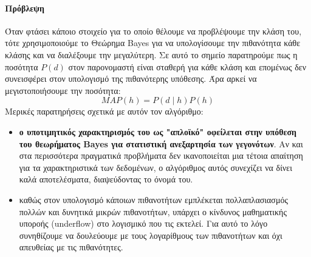 \paragraph{Πρόβλεψη} Όταν φτάσει κάποιο στοιχείο για το οποίο θέλουμε να προβλέψουμε την κλάση του, τότε χρησιμοποιούμε το Θεώρημα Bayes για να υπολογίσουμε την πιθανότητα κάθε κλάσης και να διαλέξουμε την μεγαλύτερη. Σε αυτό το σημείο παρατηρούμε πως η ποσότητα $P(d)$ στον παρονομαστή είναι σταθερή
για κάθε κλάση και επομένως δεν συνεισφέρει στον υπολογισμό της πιθανότερης υπόθεσης. Άρα αρκεί να μεγιστοποιήσουμε την ποσότητα:
\begin{equation}
MAP(h)=P(d \mid h) P(h)
\end{equation}
Μερικές παρατηρήσεις σχετικά με αυτόν τον αλγόριθμο:
\begin{itemize}
	\item \textbf{ο υποτιμητικός χαρακτηρισμός του ως "απλοϊκό" οφείλεται στην υπόθεση του θεωρήματος Bayes για στατιστική ανεξαρτησία των γεγονότων}. Αν και στα περισσότερα πραγματικά προβλήματα δεν ικανοποιείται μια τέτοια απαίτηση για τα χαρακτηριστικά των δεδομένων, ο αλγόριθμος αυτός συνεχίζει να δίνει καλά αποτελέσματα, διαψεύδοντας το όνομά του.
	\item καθώς στον υπολογισμό κάποιων πιθανοτήτων εμπλέκεται πολλαπλασιασμός πολλών και δυνητικά μικρών πιθανοτήτων, υπάρχει ο κίνδυνος μαθηματικής υποροής (underflow) στο λογισμικό που τις εκτελεί. Για αυτό το λόγο συνηθίζουμε να δουλεύουμε με τους λογαρίθμους των πιθανοτήτων και όχι απευθείας με τις πιθανότητες.
\end{itemize}